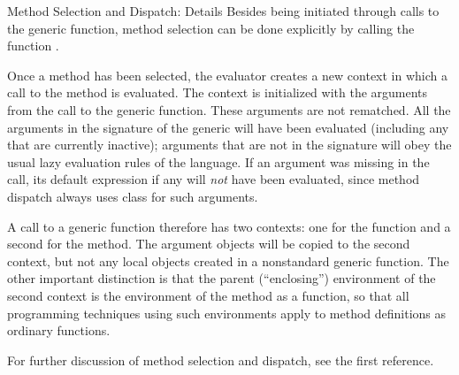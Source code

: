 \begin{Section}{Method Selection and Dispatch: Details}
Besides being initiated through calls to the generic function, method
selection can be done explicitly by calling the function
.

Once a method has been selected, the evaluator creates a new context
in which a call to the method is evaluated.
The context is initialized with the arguments from the call to the
generic function.
These arguments are not rematched.  All the arguments in the signature
of the generic will have been evaluated (including any that are
currently inactive); arguments that are not in the signature will obey
the usual lazy evaluation rules of the language.
If an argument was missing in the call, its default expression if any
will \emph{not} have been evaluated, since method dispatch always uses
class  for such arguments.

A call to a generic function therefore has two contexts:  one for the
function and a second for the method.
The argument objects will be copied to the second context, but not any
local objects created in a nonstandard generic function.
The other important distinction is that the parent 
(``enclosing'') environment of the second context is the environment
of the method as a function, so that all \R{} programming techniques
using such environments apply to method definitions as ordinary functions.


For further discussion of method selection and dispatch,  see the
first reference.

\end{Section}
%
